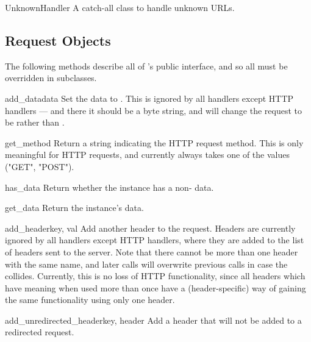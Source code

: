\begin{classdesc}{UnknownHandler}{}
A catch-all class to handle unknown URLs.
\end{classdesc}


\subsection{Request Objects \label{request-objects}}

The following methods describe all of 's public interface,
and so all must be overridden in subclasses.

\begin{methoddesc}[Request]{add_data}{data}
Set the  data to .  This is ignored by all
handlers except HTTP handlers --- and there it should be a byte
string, and will change the request to be  rather than
.
\end{methoddesc}

\begin{methoddesc}[Request]{get_method}{}
Return a string indicating the HTTP request method.  This is only
meaningful for HTTP requests, and currently always takes one of the
values ("GET", "POST").
\end{methoddesc}

\begin{methoddesc}[Request]{has_data}{}
Return whether the instance has a non- data.
\end{methoddesc}

\begin{methoddesc}[Request]{get_data}{}
Return the instance's data.
\end{methoddesc}

\begin{methoddesc}[Request]{add_header}{key, val}
Add another header to the request.  Headers are currently ignored by
all handlers except HTTP handlers, where they are added to the list
of headers sent to the server.  Note that there cannot be more than
one header with the same name, and later calls will overwrite
previous calls in case the  collides.  Currently, this is
no loss of HTTP functionality, since all headers which have meaning
when used more than once have a (header-specific) way of gaining the
same functionality using only one header.
\end{methoddesc}

\begin{methoddesc}[Request]{add_unredirected_header}{key, header}
Add a header that will not be added to a redirected request.
\end{methoddesc}

